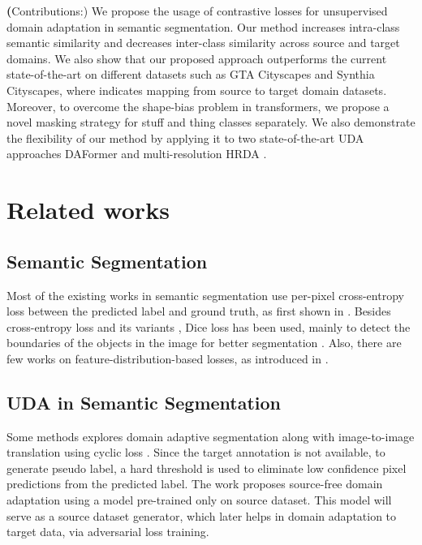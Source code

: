 \documentclass{article}
\begin{document}
\textbf(Contributions:) We propose the usage of contrastive losses for unsupervised domain adaptation in semantic segmentation. Our method increases intra-class semantic similarity and decreases inter-class similarity across source and target domains. We also show that our proposed approach outperforms the current state-of-the-art on different datasets such as GTA  Cityscapes and Synthia  Cityscapes, where  indicates mapping from source to target domain datasets. Moreover, to overcome the shape-bias problem in transformers, we propose a novel masking strategy for stuff and thing classes separately. We also demonstrate the flexibility of our method by applying it to two state-of-the-art UDA approaches DAFormer \cite{hoyer2021daformer} and multi-resolution HRDA \cite{hoyer2022hrda}.


\section{Related works}
\subsection{Semantic Segmentation}
Most of the existing works in semantic segmentation use per-pixel cross-entropy loss between the predicted label and ground truth, as first shown in \cite{long2015fully}. Besides cross-entropy loss and its variants \cite{xie2015holistically, abraham2019novel}, Dice loss has been used, mainly to detect the boundaries of the objects in the image for better segmentation \cite{diakogiannis2020resunet, zhang2017brain, soomro2018strided}. Also, there are few works on feature-distribution-based losses, as introduced in \cite{wang2021cross, zhao2021contrastive}.

\subsection{UDA in Semantic Segmentation} 
Some methods \cite{hoffman2018cycada, musto2020semantically} explores domain adaptive
segmentation along with image-to-image translation using cyclic
loss \cite{zhu2017unpaired}. Since the target annotation is not available, to generate pseudo
label, a hard threshold is used to eliminate low confidence pixel predictions
from the predicted label. The work \cite{liu2021source} proposes source-free domain adaptation using a model pre-trained only on source dataset. This model will serve as a source dataset generator, which later helps in domain adaptation to target data, via adversarial loss training. 
\end{document}
